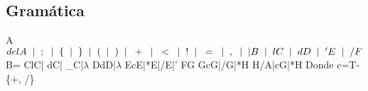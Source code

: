 \documentclass{article}
\begin{document}
\newpage
\subsection*{Gramática}
A\rightarrow \textnormal{$ delA \hspace{2mm}|\hspace{2mm} ; \hspace{2mm}|\hspace{2mm} \{ \hspace{2mm}|\hspace{2mm} \} \hspace{2mm}|\hspace{2mm} ( \hspace{2mm}|\hspace{2mm} ) \hspace{2mm}|\hspace{2mm} + \hspace{2mm}|\hspace{2mm} < \hspace{2mm}|\hspace{2mm} ! \hspace{2mm}|\hspace{2mm} = \hspace{2mm}|\hspace{2mm} , \hspace{2mm}|\hspace{2mm} |B\hspace{2mm} |\hspace{2mm} lC \hspace{2mm}| \hspace{2mm} dD \hspace{2mm}|\hspace{2mm} 'E \hspace{2mm}|\hspace{2mm} /F$} 
\smallskip \newline
B\rightarrow=
\smallskip \newline
C\rightarrow lC| dC| \_C|$\lambda$
\smallskip \newline
D\rightarrow dD|$\lambda$
\smallskip \newline
E\rightarrow cE|*E|/E|'
\smallskip \newline
F\rightarrow *G
\smallskip \newline
G\rightarrow cG|/G|*H
\smallskip \newline
H\rightarrow /A|cG|*H
\bigskip \newline 
\textnormal{Donde c=T-\{+, /\}}
\newpage
\end{document}
